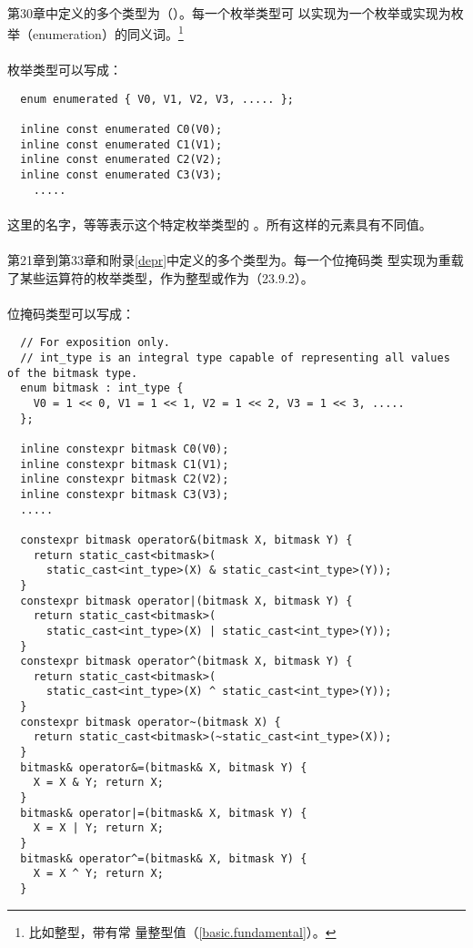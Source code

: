 \paragraph{}
第30章中定义的多个类型为（）。每一个枚举类型可
以实现为一个枚举或实现为枚举（enumeration）的同义词。\footnote{比如整型，带有常
量整型值（\ref{basic.fundamental}）。}

\paragraph{}
枚举类型可以写成：
\begin{lstlisting}
  enum enumerated { V0, V1, V2, V3, ..... };

  inline const enumerated C0(V0);
  inline const enumerated C1(V1);
  inline const enumerated C2(V2);
  inline const enumerated C3(V3);
    .....
\end{lstlisting}

\paragraph{}
这里的名字，等等表示这个特定枚举类型的
。所有这样的元素具有不同值。

\paragraph{}
第21章到第33章和附录\ref{depr}中定义的多个类型为。每一个位掩码类
型实现为重载了某些运算符的枚举类型，作为整型或作为（23.9.2）。

\paragraph{}
位掩码类型可以写成：
\begin{lstlisting}
  // For exposition only.
  // int_type is an integral type capable of representing all values of the bitmask type.
  enum bitmask : int_type {
    V0 = 1 << 0, V1 = 1 << 1, V2 = 1 << 2, V3 = 1 << 3, .....
  };

  inline constexpr bitmask C0(V0);
  inline constexpr bitmask C1(V1);
  inline constexpr bitmask C2(V2);
  inline constexpr bitmask C3(V3);
  .....

  constexpr bitmask operator&(bitmask X, bitmask Y) {
    return static_cast<bitmask>(
      static_cast<int_type>(X) & static_cast<int_type>(Y));
  }
  constexpr bitmask operator|(bitmask X, bitmask Y) {
    return static_cast<bitmask>(
      static_cast<int_type>(X) | static_cast<int_type>(Y));
  }
  constexpr bitmask operator^(bitmask X, bitmask Y) {
    return static_cast<bitmask>(
      static_cast<int_type>(X) ^ static_cast<int_type>(Y));
  }
  constexpr bitmask operator~(bitmask X) {
    return static_cast<bitmask>(~static_cast<int_type>(X));
  }
  bitmask& operator&=(bitmask& X, bitmask Y) {
    X = X & Y; return X;
  }
  bitmask& operator|=(bitmask& X, bitmask Y) {
    X = X | Y; return X;
  }
  bitmask& operator^=(bitmask& X, bitmask Y) {
    X = X ^ Y; return X;
  }
\end{lstlisting}

